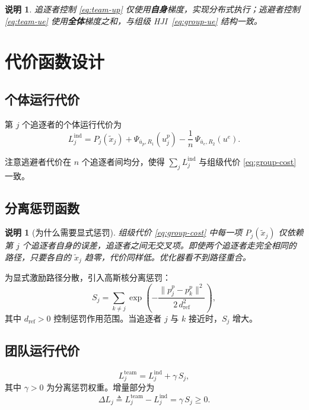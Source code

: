 \documentclass[12pt,a4paper]{ctexart}
\newtheorem{remark}[theorem]{说明}
\begin{document}
\begin{remark}
追逐者控制 \eqref{eq:team-up} 仅使用\textbf{自身}梯度，实现分布式执行；逃避者控制 \eqref{eq:team-ue} 使用\textbf{全体}梯度之和，与组级 HJI~\eqref{eq:group-ue} 结构一致。
\end{remark}


\section{代价函数设计}

\subsection{个体运行代价}

第 $j$ 个追逐者的个体运行代价为
\begin{equation}\label{eq:cost-ind}
L_j^{\mathrm{ind}} = P_j(\tilde{x}_j) + \Psi_{\bar{u}_p, R_1}(u_j^p) - \frac{1}{n}\,\Psi_{\bar{u}_e, R_2}(u^e).
\end{equation}

注意逃避者代价在 $n$ 个追逐者间均分，使得 $\sum_j L_j^{\mathrm{ind}}$ 与组级代价 \eqref{eq:group-cost} 一致。

\subsection{分离惩罚函数}

\begin{remark}[为什么需要显式惩罚]
组级代价 \eqref{eq:group-cost} 中每一项 $P_j(\tilde{x}_j)$ 仅依赖第 $j$ 个追逐者自身的误差，追逐者之间无交叉项。即使两个追逐者走完全相同的路径，只要各自的 $\tilde{x}_j$ 趋零，代价同样低。优化器看不到路径重合。
\end{remark}

为显式激励路径分散，引入高斯核分离惩罚：
\begin{equation}\label{eq:sep-penalty}
S_j = \sum_{k \neq j} \exp\!\left(-\frac{\|p_j^p - p_k^p\|^2}{2\,d_{\mathrm{ref}}^2}\right),
\end{equation}
其中 $d_{\mathrm{ref}} > 0$ 控制惩罚作用范围。当追逐者 $j$ 与 $k$ 接近时，$S_j$ 增大。

\subsection{团队运行代价}

\begin{equation}\label{eq:cost-team}
L_j^{\mathrm{team}} = L_j^{\mathrm{ind}} + \gamma\,S_j,
\end{equation}
其中 $\gamma > 0$ 为分离惩罚权重。增量部分为
\begin{equation}\label{eq:cost-increment}
\Delta L_j \triangleq L_j^{\mathrm{team}} - L_j^{\mathrm{ind}} = \gamma\,S_j \ge 0.
\end{equation}
\end{document}
